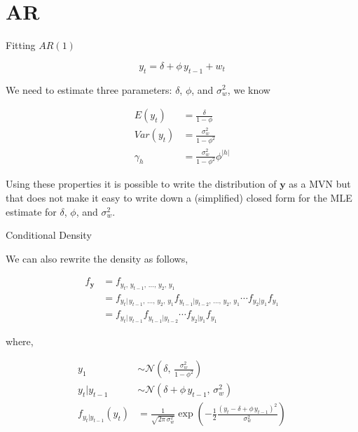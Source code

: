 \documentclass[11pt,ignorenonframetext,]{beamer}
\begin{document}
\hypertarget{ar}{%
\section{AR}\label{ar}}

\begin{frame}[t]{Fitting \(AR(1)\)}
\protect\hypertarget{fitting-ar1}{}

\[ y_t = \delta + \phi \, y_{t-1} + w_t \]

We need to estimate three parameters: \(\delta\), \(\phi\), and
\(\sigma_w^2\), we know

\[ 
\begin{aligned}
E(y_t) &= \frac{\delta}{1-\phi} \\
Var(y_t) &= \frac{\sigma_w^2}{1-\phi^2} \\
\gamma_h &= \frac{\sigma_w^2}{1-\phi^2} \phi^{|h|}
\end{aligned} 
\]

Using these properties it is possible to write the distribution of
\(\symbf{y}\) as a MVN but that does not make it easy to write down a
(simplified) closed form for the MLE estimate for \(\delta\), \(\phi\),
and \(\sigma_w^2\).

\end{frame}

\begin{frame}{Conditional Density}
\protect\hypertarget{conditional-density}{}

We can also rewrite the density as follows,

\[
\begin{aligned}
f_{\symbf y}
  &= f_{y_t,\,y_{t-1},\,\ldots,\,y_2,\,y_1} \\
  &= f_{y_t|\,y_{t-1},\,\ldots,\,y_2,\,y_1} f_{y_{t-1}|y_{t-2},\,\ldots,\,y_2,\,y_1} \cdots f_{y_2|y_1} f_{y_1} \\
  &= f_{y_t|\,y_{t-1}} f_{y_{t-1}|y_{t-2}} \cdots f_{y_2|y_1} f_{y_1} 
\end{aligned}
\]

where,

\[
\begin{aligned}
y_1 &\sim \mathcal{N}\left(\delta, \, \frac{\sigma^2_w}{1-\phi^2} \right) \\
y_{t}|y_{t-1} &\sim \mathcal{N}\left(\delta+\phi\, y_{t-1}, \, \sigma^2_w \right) \\
f_{y_{t}|y_{t-1}}(y_t) &= \frac{1}{\sqrt{2\pi \, \sigma^2_w}} \exp \left( -\frac{1}{2}\frac{(y_t -\delta+\phi\, y_{t-1})^2 }{\sigma^2_w} \right)
\end{aligned}
\]

\end{frame}
\end{document}
